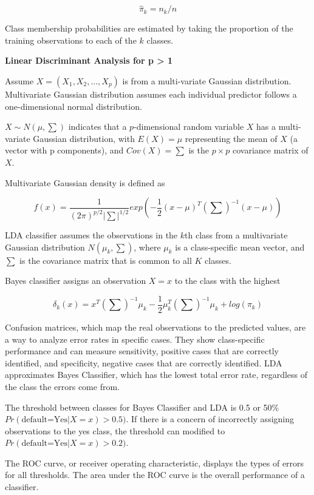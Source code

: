 \documentclass[
]{article}
\begin{document}
\[\hat{\pi}_k = n_k/n\]

Class membership probabilities are estimated by taking the proportion of
the training observations to each of the \(k\) classes.

\textbf{Linear Discriminant Analysis for p \textgreater{} 1}

Assume \(X = (X_1, X_2, ... , X_p)\) is from a multi-variate Gaussian
distribution. Multivariate Gaussian distribution assumes each individual
predictor follows a one-dimensional normal distribution.

\(X \sim N(\mu, \sum)\) indicates that a \(p\)-dimensional random
variable \(X\) has a multi-variate Gaussian distribution, with
\(E(X) = \mu\) representing the mean of \(X\) (a vector with p
components), and \(Cov(X) = \sum\) is the \(p \times p\) covariance
matrix of \(X\).

Multivariate Gaussian density is defined as

\[f(x) = \frac{1}{(2\pi)^{p/2}|\sum|^{1/2}}exp(-\frac{1}{2}(x-\mu)^T(\sum)^{-1}(x-\mu))\]

LDA classifier assumes the observations in the \(k\)th class from a
multivariate Gaussian distribution \(N(\mu_k, \sum)\), where \(\mu_k\)
is a class-specific mean vector, and \(\sum\) is the covariance matrix
that is common to all \(K\) classes.

Bayes classifier assigns an observation \(X=x\) to the class with the
highest

\[\delta_k(x) = x^T(\sum)^{-1}\mu_k-\frac{1}{2}\mu^T_k(\sum)^{-1}\mu_k+log(\pi_k)\]

Confusion matrices, which map the real observations to the predicted
values, are a way to analyze error rates in specific cases. They show
class-specific performance and can measure sensitivity, positive cases
that are correctly identified, and specificity, negative cases that are
correctly identified. LDA approximates Bayes Classifier, which has the
lowest total error rate, regardless of the class the errors come from.

The threshold between classes for Bayes Classifier and LDA is 0.5 or
50\% \(Pr(\text{default=Yes}|X=x)>0.5)\). If there is a concern of
incorrectly assigning observations to the yes class, the threshold can
modified to \(Pr(\text{default=Yes}|X=x)>0.2)\).

The ROC curve, or receiver operating characteristic, displays the types
of errors for all thresholds. The area under the ROC curve is the
overall performance of a classifier.
\end{document}
